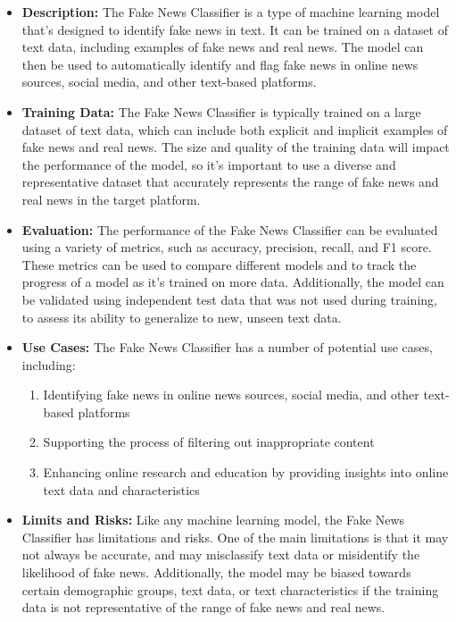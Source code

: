 \begin{itemize}
\begin{itemize}
    \item \textbf{Description:} The Fake News Classifier is a type of machine learning model that's designed to identify fake news in text. It can be trained on a dataset of text data, including examples of fake news and real news. The model can then be used to automatically identify and flag fake news in online news sources, social media, and other text-based platforms.
    \item \textbf{Training Data:} The Fake News Classifier is typically trained on a large dataset of text data, which can include both explicit and implicit examples of fake news and real news. The size and quality of the training data will impact the performance of the model, so it's important to use a diverse and representative dataset that accurately represents the range of fake news and real news in the target platform.
    \item \textbf{Evaluation:} The performance of the Fake News Classifier can be evaluated using a variety of metrics, such as accuracy, precision, recall, and F1 score. These metrics can be used to compare different models and to track the progress of a model as it's trained on more data. Additionally, the model can be validated using independent test data that was not used during training, to assess its ability to generalize to new, unseen text data.
    \item \textbf{Use Cases:} The Fake News Classifier has a number of potential use cases, including:
        \begin{enumerate}  
            \item Identifying fake news in online news sources, social media, and other text-based platforms
            \item Supporting the process of filtering out inappropriate content
            \item Enhancing online research and education by providing insights into online text data and characteristics
        \end{enumerate}
    \item \textbf{Limits and Risks:} Like any machine learning model, the Fake News Classifier has limitations and risks. One of the main limitations is that it may not always be accurate, and may misclassify text data or misidentify the likelihood of fake news. Additionally, the model may be biased towards certain demographic groups, text data, or text characteristics if the training data is not representative of the range of fake news and real news.

\end{itemize}
\end{itemize}
